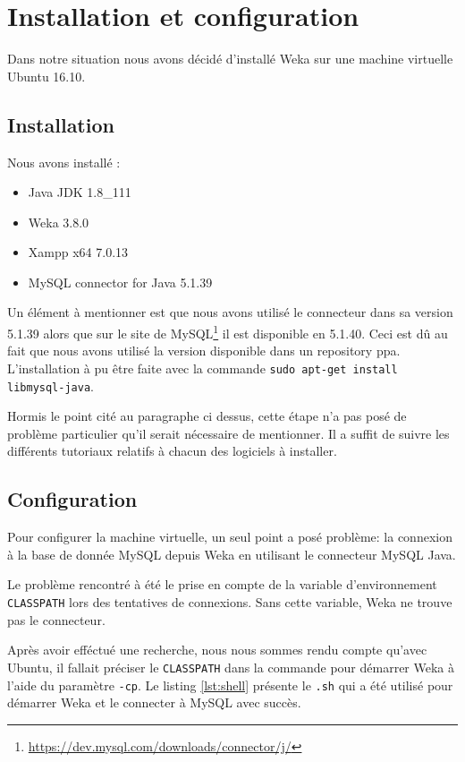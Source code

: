 \chapter{Installation et configuration}

Dans notre situation nous avons décidé d'installé Weka sur une machine virtuelle Ubuntu 16.10.

\section{Installation}

Nous avons installé :

\begin{itemize}
	\item Java JDK 1.8\_111
	\item Weka 3.8.0
	\item Xampp x64 7.0.13 
	\item MySQL connector for Java 5.1.39
\end{itemize}

Un élément à mentionner est que nous avons utilisé le connecteur dans sa version 5.1.39 alors que sur le site de MySQL\footnote{\url{https://dev.mysql.com/downloads/connector/j/}} il est disponible en 5.1.40. Ceci est dû au fait que nous avons utilisé la version disponible dans un repository ppa. L'installation à pu être faite avec la commande \texttt{sudo apt-get install libmysql-java}.

Hormis le point cité au paragraphe ci dessus, cette étape n'a pas posé de problème particulier qu'il serait nécessaire de mentionner. Il a suffit de suivre les différents tutoriaux relatifs à chacun des logiciels à installer.

\section{Configuration}

Pour configurer la machine virtuelle, un seul point a posé problème: la connexion à la base de donnée MySQL depuis Weka en utilisant le connecteur MySQL Java.

Le problème rencontré à été le prise en compte de la variable d'environnement \texttt{CLASSPATH} lors des tentatives de connexions. Sans cette variable, Weka ne trouve pas le connecteur.

Après avoir efféctué une recherche, nous nous sommes rendu compte qu'avec Ubuntu, il fallait préciser le \texttt{CLASSPATH} dans la commande pour démarrer Weka à l'aide du paramètre \texttt{-cp}. Le listing \autoref{lst:shell} présente le \texttt{.sh} qui a été utilisé pour démarrer Weka et le connecter à MySQL avec succès.

